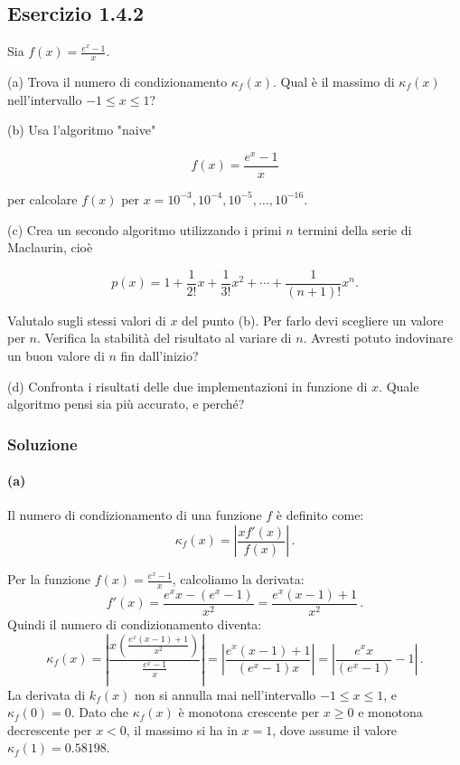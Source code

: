 \documentclass[letterpaper, 12pt]{article}
\begin{document}
\subsection{Esercizio 1.4.2}
Sia $f(x) = \frac{e^x-1}{x}$.
  
(a) Trova il numero di condizionamento $\kappa_f(x)$. Qual è il massimo di $\kappa_f(x)$ nell'intervallo $-1\le x \le 1$?
  
(b) Usa l'algoritmo "naive"

\begin{equation}
    f(x)= \frac{e^x-1}{x}
    \label{eq:algoritmo_naive}
\end{equation}

per calcolare $f(x)$ per $x=10^{-3},10^{-4},10^{-5},\ldots,10^{-16}$.

(c) Crea un secondo algoritmo utilizzando i primi $n$ termini della serie di Maclaurin, cioè

\begin{equation}
    p(x) = 1 + \frac{1}{2!}x + \frac{1}{3!}x^2 + \cdots + \frac{1}{(n+1)!}x^n.
    \label{eq:algoritmo_maclaurin}
\end{equation}

Valutalo sugli stessi valori di $x$ del punto (b). Per farlo devi scegliere un valore per $n$. Verifica la stabilità del risultato al variare di $n$. Avresti potuto indovinare un buon valore di $n$ fin dall'inizio?

(d) Confronta i risultati delle due implementazioni in funzione di $x$. Quale algoritmo pensi sia più accurato, e perché?

\subsubsection{Soluzione}

\paragraph{(a) } Il numero di condizionamento di una funzione $f$ è definito come:
\begin{equation}
    \kappa_f(x) = \left| \frac{x f'(x)}{f(x)} \right|\,.
\end{equation}

Per la funzione $f(x) = \frac{e^x-1}{x}$, calcoliamo la derivata:
\begin{equation}
    f'(x) = \frac{e^x x - (e^x - 1)}{x^2} = \frac{e^x (x-1) + 1}{x^2}\,.
\end{equation}
Quindi il numero di condizionamento diventa:
\begin{equation}
    \kappa_f(x) = \left| \frac{x \left( \frac{e^x (x-1) + 1}{x^2} \right)}{\frac{e^x - 1}{x}} \right| = \left| \frac{e^x (x-1) + 1}{(e^x - 1)x} \right| = \left| \frac{e^x x}{(e^x - 1)} - 1 \right|\,.
\end{equation}
La derivata di $k_f(x)$ non si annulla mai nell'intervallo $-1 \leq x \leq 1$, e $\kappa_f(0) = 0$. Dato che
$\kappa_f(x)$ è monotona crescente per $x \geq 0$ e monotona decrescente per $x < 0$, il massimo si ha in $x = 1$,
dove assume il valore $\kappa_f(1) = 0.58198$.
\end{document}
